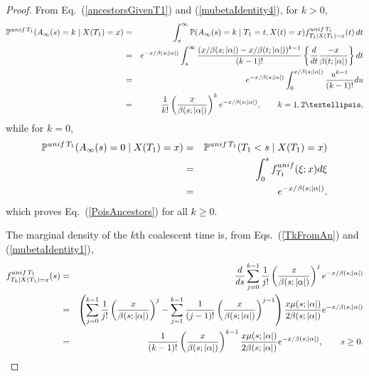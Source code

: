 \documentclass[10pt,a4paper]{amsart}
\begin{document}
\begin{proof}
From Eq.~(\ref{ancestorsGivenT1}) and (\ref{mubetaIdentity4}), for $k > 0$, 
\begin{eqnarray*}
\mathbb{P}^{{\rm unif}\,T_1}(A_\infty(s) = k \mid X(T_1) = x) 
	& = & \int_s ^\infty \mathbb{P}(A_\infty(s) = k \mid T_1 = t, X(t) = x) f^{{\rm unif}\,T_1} _{T_1 \mid X(T_1) = x} (t)  \,dt \\
	& = & e^{-x/\beta(s; |\alpha|)} \int_s^\infty  \frac{(x/\beta(s; |\alpha|) - x/\beta(t; |\alpha|))^{k - 1}}{(k - 1)!}   \left\{\frac{d}{dt} \frac{-x}{\beta(t; |\alpha|)}\right\} dt \\
	& = & e^{-x/\beta(s; |\alpha|)} \int_0^{x/\beta(s; |\alpha|)}  \frac{u^{k - 1}}{(k - 1)!} du \\
	& = & \frac{1}{k!} \left(\frac{x}{\beta(s; |\alpha|)} \right)^k e^{-x/\beta(s; |\alpha|)}, \qquad k = 1, 2 \ldots,   
\end{eqnarray*}
while for $k = 0$, 
\begin{eqnarray*}
\mathbb{P}^{{\rm unif}\,T_1}(A_\infty(s) = 0 \mid X(T_1) = x) & = & \mathbb{P}^{{\rm unif}\,T_1} (T_1 < s \mid X(T_1) = x) \\
	& = & \int_0^s f^{\rm unif}_{T_1} (\xi ; x) d\xi \\
	& = & e^{-x/\beta(s; |\alpha|)}, 
\end{eqnarray*}
which proves Eq.~(\ref{PoisAncestors}) for all $k \ge 0$.  

The marginal density of the $k$th coalescent time is, from Eqs.~(\ref{TkFromAn}) and (\ref{mubetaIdentity1}),
\begin{eqnarray*}
f_{T_k \mid X(T_1) = x}^{{\rm unif}\,T_1}(s) & = & \frac{d}{ds} \sum_{j = 0}^{k - 1} \frac{1}{j!} \left(\frac{x}{\beta(s; |\alpha|)} \right)^j e^{-x/\beta(s; |\alpha|)} \nonumber \\
	& = & \left(\sum_{j = 0}^{k - 1} \frac{1}{j!} \left(\frac{x}{\beta(s; |\alpha|)} \right)^j - \sum_{j = 1}^{k - 1} \frac{1}{(j - 1)!} \left(\frac{x}{\beta(s; |\alpha|)} \right)^{j - 1} \right)
									\frac{x\mu(s; |\alpha|)}{2\beta(s; |\alpha|)} e^{-x/\beta(s; |\alpha|)} \nonumber \\ 
	& = & \frac{1}{(k - 1)!} \left(\frac{x}{\beta(s; |\alpha|)} \right)^{k  - 1} \frac{x\mu(s; |\alpha|)}{2\beta(s; |\alpha|)} e^{-x/\beta(s; |\alpha|)}, \qquad s \ge 0.  
\end{eqnarray*}


\end{proof}
\end{document}
